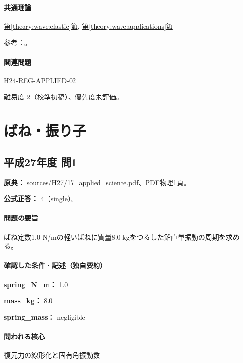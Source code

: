 \paragraph{共通理論} \hyperref[theory:wave:elastic]{第\ref*{theory:wave:elastic}節}, \hyperref[theory:wave:applications]{第\ref*{theory:wave:applications}節}

\par 参考：\cite{os_sound}。

\paragraph{関連問題} \hyperref[q:h24-reg-applied-02]{H24-REG-APPLIED-02}

\par 難易度 2（校準初稿）、優先度未評価。

\section{ばね・振り子}

\subsection{平成27年度 問1}
\label{q:h27-reg-applied-01}

\noindent\textbf{原典：} sources/H27/17\_applied\_science.pdf、PDF物理1頁。

\textbf{公式正答：} 4（single）。

\paragraph{問題の要旨} ばね定数1.0 N/mの軽いばねに質量8.0 kgをつるした鉛直単振動の周期を求める。

\paragraph{確認した条件・記述（独自要約）}\mbox{}\par

\noindent\textbf{spring\_N\_m：} 1.0\par

\noindent\textbf{mass\_kg：} 8.0\par

\noindent\textbf{spring\_mass：} negligible\par

\paragraph{問われる核心} 復元力の線形化と固有角振動数

